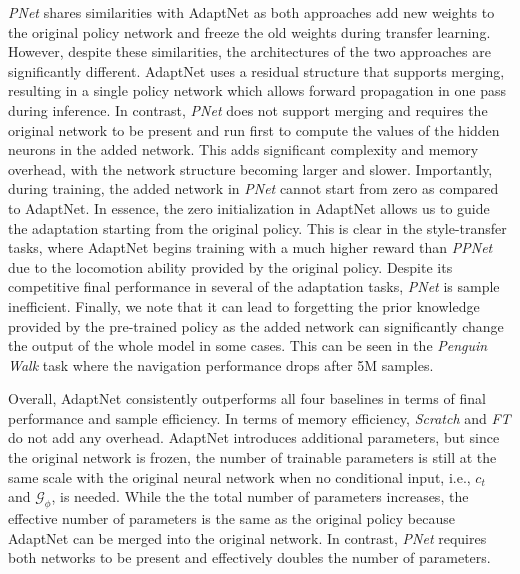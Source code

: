 \emph{PNet} shares similarities with AdaptNet as both approaches add new weights to the original policy 
network and freeze the old weights during transfer learning. However, despite these similarities, the architectures of the two approaches are significantly different. AdaptNet uses a residual structure that supports merging, resulting in a single policy network which allows forward propagation in one pass during inference. In contrast, \emph{PNet} does not support merging and requires the original network to be present and run first to compute the values of the hidden neurons in the added network. 
This adds significant complexity and memory overhead, with the network structure becoming larger and slower.
Importantly, during training, the added network in \emph{PNet} cannot start from zero as compared to AdaptNet. In essence, the zero initialization in AdaptNet allows us to guide the adaptation starting from the original policy.  This is clear in the
style-transfer tasks, where AdaptNet begins training with a much higher reward than \emph{PPNet} due to the locomotion ability provided by the original policy. 
Despite its competitive final performance in several of the adaptation tasks, \emph{PNet} is sample inefficient. %
Finally, we note that %
it can lead to forgetting the prior knowledge provided by the pre-trained policy as the added network 
can
significantly change the output of the whole model in some cases. 
This can be seen in the \textit{Penguin Walk} task where the navigation performance drops after 5M samples.


Overall, AdaptNet consistently outperforms all four baselines in terms of final performance and sample efficiency. In terms of memory efficiency, \emph{Scratch} and \emph{FT} do not add any overhead.
AdaptNet introduces additional parameters, but since 
the original network is frozen, 
the number of trainable parameters is still at the same scale with the original neural network when no conditional input, i.e., $c_t$ and $\mathcal{G}_\phi$, is needed.  
While the the total number of parameters 
increases, the effective number of parameters is the 
same as the original policy because
AdaptNet can be merged into the original network. In contrast, \emph{PNet} requires both networks to be present and effectively doubles the number of parameters. 


